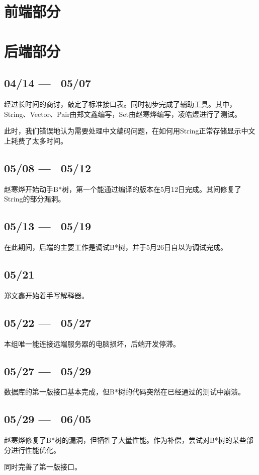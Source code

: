 \documentclass[12pt,a4paper,UTF8]{report}
\begin{document}
\section{前端部分}
\section{后端部分}
\setcounter{secnumdepth}{-2}
\subsection{04/14 — \ 05/07}
\par 经过长时间的商讨，敲定了标准接口表。同时初步完成了辅助工具。其中，String、Vector、Pair由郑文鑫编写，Set由赵寒烨编写，凌皓煜进行了测试。
\par 此时，我们错误地认为需要处理中文编码问题，在如何用String正常存储显示中文上耗费了太多时间。
\subsection{05/08 — \ 05/12}
\par 赵寒烨开始动手B*树，第一个能通过编译的版本在5月12日完成。其间修复了String的部分漏洞。
\subsection{05/13 — \ 05/19}
\par 在此期间，后端的主要工作是调试B*树，并于5月26日自以为调试完成。
\subsection{05/21}
\par 郑文鑫开始着手写解释器。
\subsection{05/22 — \ 05/27}
\par 本组唯一能连接远端服务器的电脑损坏，后端开发停滞。
\subsection{05/27 — \ 05/29}
\par 数据库的第一版接口基本完成，但B*树的代码突然在已经通过的测试中崩溃。
\subsection{05/29 — \ 06/05}
\par 赵寒烨修复了B*树的漏洞，但牺牲了大量性能。作为补偿，尝试对B*树的某些部分进行性能优化。
\par 同时完善了第一版接口。
\end{document}
